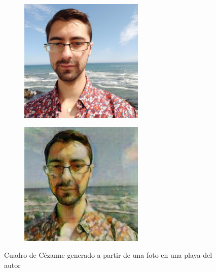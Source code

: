 \documentclass[[../main.tex]{subfiles}
\begin{document}
        \begin{figure}[!htb]
            \begin{subfigure}[b]{0.49\textwidth}
            \includegraphics[width=0.65\textwidth]{imagenes/imagen2cuadro/propias/cezanne/IMG_20190901_131836.jpg}
            \end{subfigure}
        \hfill
            \begin{subfigure}[b]{0.49\textwidth}
            \includegraphics[width=0.65\textwidth]{imagenes/imagen2cuadro/propias/cezanne/IMG_20190901_131836_2.jpg}
            \end{subfigure}
        \caption{Cuadro de Cézanne generado a partir de una foto en una playa del autor}
        \label{fig:cezanne_cuadro_selfie_playa}
        \end{figure}
        
\end{document}
